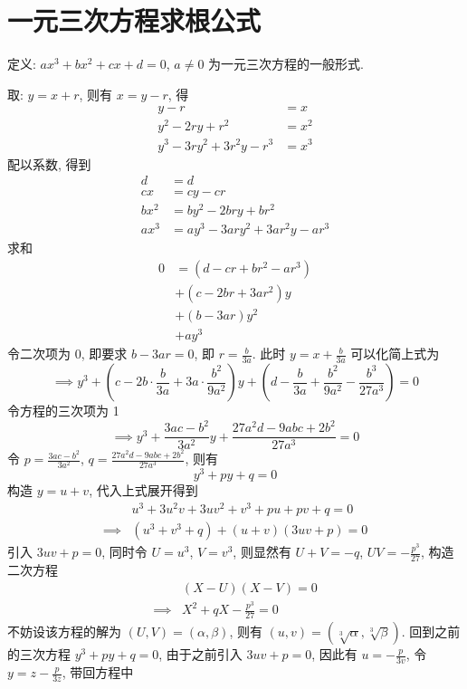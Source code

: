 \section{一元三次方程求根公式}

定义: $ax^3 + bx^2 + cx + d = 0$, $a \ne 0$ 为一元三次方程的一般形式.

取: $y = x + r$, 则有 $x = y - r$, 得
\[ \begin{aligned}
    y - r &= x \\
    y^2 - 2ry + r^2 &= x^2 \\
    y^3 - 3ry^2 + 3r^2y - r^3 &= x^3
\end{aligned} \]
配以系数, 得到
\[ \begin{aligned}
    d &= d \\
    cx &= cy - cr \\
    bx^2 &= by^2 - 2bry + br^2 \\
    ax^3 &= ay^3 - 3ary^2 + 3ar^2y - ar^3
\end{aligned} \]
求和
\[ \begin{aligned}
    0 &= (d - cr + br^2 - ar^3) \\
    &+ (c - 2br + 3ar^2) y \\
    &+ (b - 3ar) y^2 \\
    &+ ay^3
\end{aligned} \]
令二次项为 0, 即要求 $b - 3ar = 0$, 即 $r = \frac{b}{3a}$. 此时 $y = x + \frac{b}{3a}$ 可以化简上式为
\[
    \implies y^3 + (c - 2b \cdot \frac{b}{3a} + 3a \cdot \frac{b^2}{9a^2}) y
    + (d - \frac{b}{3a} + \frac{b^2}{9a^2} - \frac{b^3}{27a^3}) = 0
\]
令方程的三次项为 1
\[
    \implies y^3 + \frac{3ac-b^2}{3a^2} y + \frac{27a^2d - 9abc + 2b^2}{27a^3} = 0
\]
令 $p = \frac{3ac-b^2}{3a^2}$, $q = \frac{27a^2d - 9abc + 2b^2}{27a^3}$, 则有
\[
    y^3 + p y + q = 0
\]
构造 $y = u + v$, 代入上式展开得到
\[ \begin{aligned}
    & u^3 + 3u^2v + 3uv^2 + v^3 + pu + pv + q = 0 \\
    \implies & (u^3 + v^3 + q) + (u + v)(3uv + p) = 0
\end{aligned} \]
引入 $3uv + p = 0$, 同时令 $U = u^3$, $V = v^3$, 则显然有 $U + V = -q$, $UV = -\frac{p^3}{27}$, 构造二次方程
\[ \begin{aligned}
    & (X - U)(X - V) = 0 \\
    \implies & X^2 + qX - \frac{p^3}{27} = 0
\end{aligned} \]
不妨设该方程的解为 $(U, V) = (\alpha, \beta)$, 则有 $(u, v) = (\sqrt[3]{\alpha}, \sqrt[3]{\beta})$. 回到之前的三次方程 $y^3 + py + q = 0$, 由于之前引入 $3uv + p = 0$, 因此有 $u = -\frac{p}{3v}$, 令 $y = z - \frac{p}{3z}$, 带回方程中
